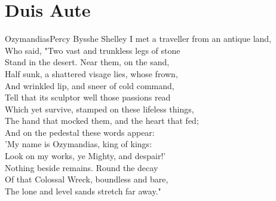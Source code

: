 \documentclass[../main.tex]{subfiles}
\begin{document}
	\chapter{Duis Aute}

	\begin{poem*}{Ozymandias}{Percy Bysshe Shelley}
		I met a traveller from an antique land, \\
		Who said, "Two vast and trunkless legs of stone \\
		Stand in the desert. Near them, on the sand, \\
		Half sunk, a shattered visage lies, whose frown,\\
		And wrinkled lip, and sneer of cold command,\\
		Tell that its sculptor well those passions read\\
		Which yet survive, stamped on these lifeless things,\\
		The hand that mocked them, and the heart that fed;\\
		And on the pedestal these words appear:\\
		'My name is Ozymandias, king of kings:\\
		Look on my works, ye Mighty, and despair!'\\
		Nothing beside remains. Round the decay\\
		Of that Colossal Wreck, boundless and bare,\\
		The lone and level sands stretch far away."\\
	\end{poem*}
\end{document}
